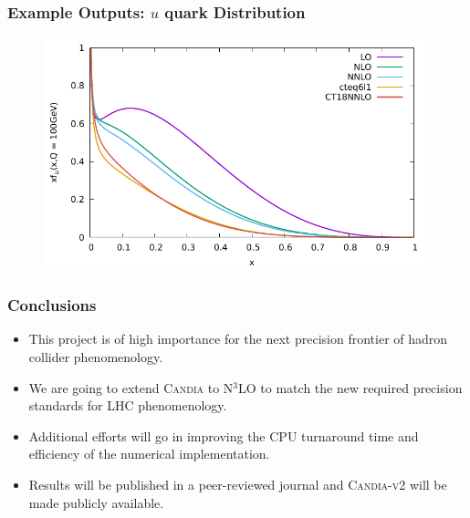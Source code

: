 \documentclass{beamer}
\begin{document}
\begin{frame}
  \frametitle{Example Outputs: $u$ quark Distribution}

  \begin{figure}
    \centering
    \includegraphics[width=0.9\linewidth]{./gfx/u-new.pdf}
  \end{figure}

\end{frame}



\begin{frame}
  \frametitle{Conclusions}

  \begin{itemize}
  \item This project is of high importance for the next precision frontier of hadron collider phenomenology. 
  \item We are going to extend \textsc{Candia} to N$^3$LO to match the new required precision standards for LHC phenomenology.
  \item Additional efforts will go in improving the CPU turnaround time and efficiency of the numerical implementation.
  \item Results will be published in a peer-reviewed journal and \textsc{Candia-v2} will be made publicly available.
  \end{itemize}
\end{frame}
\end{document}
